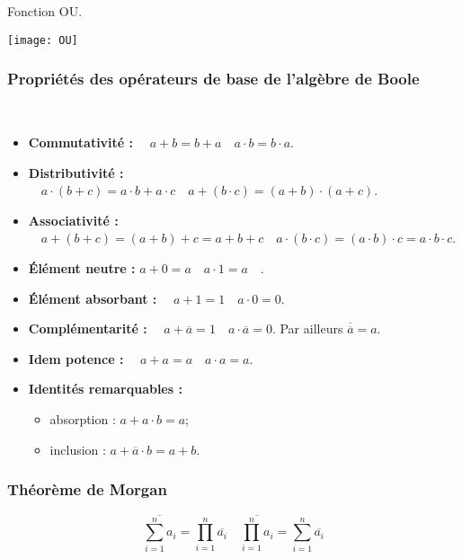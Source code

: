 \begin{exemple}
Fonction OU.


\begin{center}
\texttt{[image: OU]}
\end{center}
\end{exemple}

\subsubsection{Propriétés des opérateurs de base de l'algèbre de Boole}

\begin{prop} ~\\

\begin{itemize}
\item \textbf{Commutativité :} $\quad a+b = b+a \quad a\cdot b = b\cdot a$.
\item \textbf{Distributivité :} $\quad a\cdot (b+c) = a\cdot b+a \cdot c \quad  a+(b\cdot c) = (a+b) \cdot (a+c)$.
\item \textbf{Associativité :} $\quad a + (b+c) = (a+b)+c = a+b+c \quad a \cdot (b\cdot c) = (a\cdot b)\cdot c = a \cdot b\cdot c$.
\item \textbf{Élément neutre :} $ a + 0 = a \quad a\cdot 1 = a \quad$.
\item \textbf{Élément absorbant :} $\quad  a + 1 = 1 \quad a\cdot 0 = 0$.
\item \textbf{Complémentarité :} $ \quad a + \overline{a} = 1\quad  a\cdot \overline{a} = 0$.
Par ailleurs $\overline{\overline{a}}=a$.
\item \textbf{Idem potence :} $\quad a + a = a \quad a\cdot a = a$.
\item \textbf{Identités remarquables :}
\begin{itemize} 
\item absorption : $ a + a\cdot b = a$;
\item inclusion : $a+\overline{a}\cdot b = a+b$.
\end{itemize}
\end{itemize}
\end{prop}

\subsubsection{Théorème de Morgan}
\begin{theorem}
$$
\overline{\sum\limits_{i=1}^{n} a_i} = \prod\limits_{i=1}^n \overline{a_i}
\quad
\overline{\prod\limits_{i=1}^{n} a_i} = \sum\limits_{i=1}^n \overline{a_i}
$$
\end{theorem}

